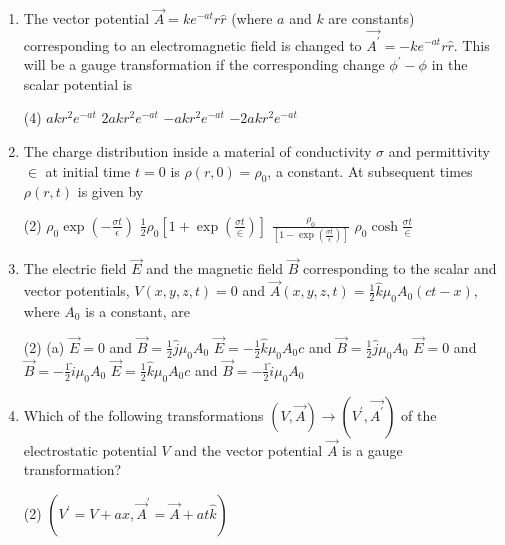 \begin{enumerate}
	
	\item The vector potential $\vec{A}=k e^{-a t} r \hat{r}$ (where $a$ and $k$ are constants) corresponding to an electromagnetic field is changed to $\overrightarrow{A^{\prime}}=-k e^{-a t} r \hat{r}$. This will be a gauge transformation if the corresponding change $\phi^{\prime}-\phi$ in the scalar potential is
	{}
	\begin{tasks}(4)
		\task[\textbf{A.}] $a k r^{2} e^{-a t}$
		\task[\textbf{B.}] $2 a k r^{2} e^{-a t}$
		\task[\textbf{C.}] $-a k r^{2} e^{-a t}$
		\task[\textbf{D.}] $-2 a k r^{2} e^{-a t}$
	\end{tasks}
	\item The charge distribution inside a material of conductivity $\sigma$ and permittivity $\in$ at initial time $t=0$ is $\rho(r, 0)=\rho_{0}$, a constant. At subsequent times $\rho(r, t)$ is given by
	{}
	\begin{tasks}(2)
		\task[\textbf{A.}]  $\rho_{0} \exp \left(-\frac{\sigma t}{\epsilon}\right)$
		\task[\textbf{B.}] $\frac{1}{2} \rho_{0}\left[1+\exp \left(\frac{\sigma t}{\in}\right)\right]$
		\task[\textbf{C.}]  $\frac{\rho_{0}}{\left[1-\exp \left(\frac{\sigma t}{\epsilon}\right)\right]}$
		\task[\textbf{D.}] $\rho_{0} \cosh \frac{\sigma t}{\in}$
	\end{tasks}
	\item  The electric field $\vec{E}$ and the magnetic field $\vec{B}$ corresponding to the scalar and vector potentials, $V(x, y, z, t)=0$ and $\vec{A}(x, y, z, t)=\frac{1}{2} \hat{k} \mu_{0} A_{0}(c t-x)$, where $A_{0}$ is a constant, are 
	{}
	\begin{tasks}(2)
		\task[\textbf{A.}] (a) $\vec{E}=0$ and $\vec{B}=\frac{1}{2} \hat{j} \mu_{0} A_{0}$
		\task[\textbf{B.}] $\vec{E}=-\frac{1}{2} \hat{k} \mu_{0} A_{0} c$ and $\vec{B}=\frac{1}{2} \hat{j} \mu_{0} A_{0}$
		\task[\textbf{C.}]  $\vec{E}=0$ and $\vec{B}=-\frac{1}{2} \hat{i} \mu_{0} A_{0}$
		\task[\textbf{D.}] $\vec{E}=\frac{1}{2} \hat{k} \mu_{0} A_{0} c$ and $\vec{B}=-\frac{1}{2} \hat{i} \mu_{0} A_{0}$
	\end{tasks}
\item Which of the following transformations $(V, \vec{A}) \rightarrow\left(V^{\prime}, \overrightarrow{A^{\prime}}\right)$ of the electrostatic potential $V$ and the vector potential $\vec{A}$ is a gauge transformation?
{}
 \begin{tasks}(2)
	\task[\textbf{a.}]$\left(V^{\prime}=V+a x, \vec{A}^{\prime}=\vec{A}+a t \hat{k}\right)$

\end{tasks}
\end{enumerate}

